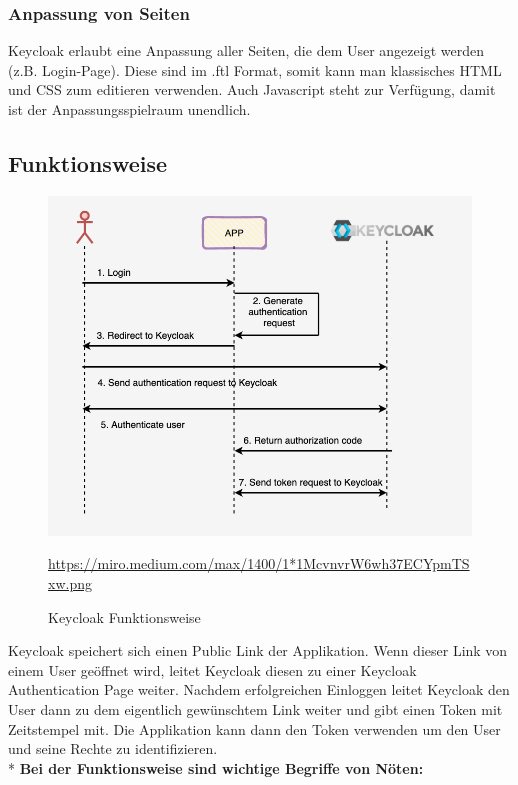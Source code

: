 \subsubsection{Anpassung von Seiten}
Keycloak erlaubt eine Anpassung aller Seiten, die dem User angezeigt werden (z.B. Login-Page). Diese sind im .ftl Format, somit kann man klassisches HTML und CSS zum editieren verwenden.
Auch Javascript steht zur Verfügung, damit ist der Anpassungsspielraum unendlich. \cite{KeyCloakDZone}
\pagebreak

\subsection{Funktionsweise}
\begin{figure}[htp]
    \centering
    \includegraphics[scale=0.55]{pics/Keycloak-Funktionsweise2.png}
    \caption{Keycloak Funktionsweise}
    \small \url{https://miro.medium.com/max/1400/1*1McvnvrW6wh37ECYpmTSxw.png}
    \label{fig:impl:KeycloakFunc}
\end{figure}

Keycloak speichert sich einen Public Link der Applikation. Wenn dieser Link von einem User geöffnet wird, leitet Keycloak diesen zu einer Keycloak Authentication Page weiter.
Nachdem erfolgreichen Einloggen leitet Keycloak den User dann zu dem eigentlich gewünschtem Link weiter und gibt einen Token mit Zeitstempel mit.
Die Applikation kann dann den Token verwenden um den User und seine Rechte zu identifizieren. \cite{KeycloakMakeIT} \\*
\textbf{Bei der Funktionsweise sind wichtige Begriffe von Nöten:}

